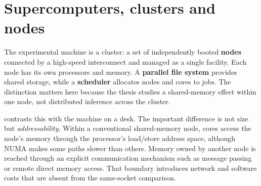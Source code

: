 
\section{Supercomputers, clusters and nodes}
\label{sec:hpc-primer}

The experimental machine is a cluster: a set of independently booted
\textbf{nodes} connected by a high-speed interconnect and managed as a
single facility.  Each node has its own processors and memory.  A
\textbf{parallel file system} provides shared storage, while a
\textbf{scheduler} allocates nodes and cores to jobs.  The distinction
matters here because the thesis studies a shared-memory effect within one
node, not distributed inference across the cluster.

 contrasts this with the machine on
a desk.  The important difference is not size but \emph{addressability}.
Within a conventional shared-memory node, cores access the node's memory
through the processor's load/store address space, although NUMA makes
some paths slower than others.  Memory owned by another node is reached
through an explicit communication mechanism such as message passing or
remote direct memory access.  That boundary introduces network and
software costs that are absent from the same-socket comparison.

